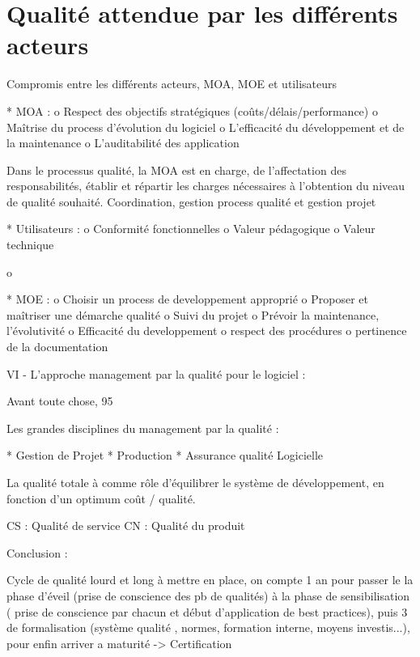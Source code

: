 \section{Qualité attendue par les différents acteurs}

Compromis entre les différents acteurs, MOA, MOE et utilisateurs

    * MOA :
          o Respect des objectifs stratégiques (coûts/délais/performance)
          o Maîtrise du process d’évolution du logiciel
          o L’efficacité du développement et de la maintenance
          o L’auditabilité des application



Dans le processus qualité, la MOA est en charge, de l’affectation des responsabilités, établir et répartir les charges nécessaires à l’obtention du niveau de qualité souhaité.
Coordination, gestion process qualité et gestion projet

    * Utilisateurs :
          o Conformité fonctionnelles
          o Valeur pédagogique
          o Valeur technique

o

    * MOE :
          o Choisir un process de developpement approprié
          o Proposer et maîtriser une démarche qualité
          o Suivi du projet
          o Prévoir la maintenance, l’évolutivité
          o Efficacité du developpement
          o respect des procédures
          o pertinence de la documentation 




VI - L’approche management par la qualité pour le logiciel :

Avant toute chose,  95%

Les grandes disciplines du management par la qualité :

    * Gestion de Projet
    * Production
    * Assurance qualité Logicielle 



La qualité totale à comme rôle d’équilibrer le système de développement, en fonction d’un optimum coût / qualité.

CS : Qualité de service
CN : Qualité du produit

Conclusion :

Cycle de qualité lourd et long  à mettre en place, on compte 1 an pour passer le la phase d’éveil (prise de conscience des pb de qualités) à la phase de sensibilisation ( prise de conscience par chacun et début d’application de best practices), puis 3 de formalisation (système qualité , normes, formation interne, moyens investis...), pour enfin arriver a maturité -> Certification 